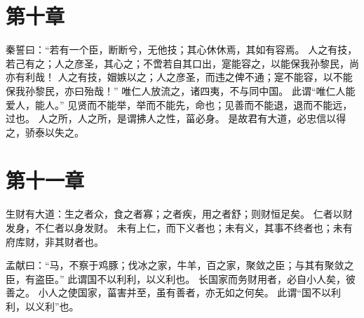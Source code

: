 \documentclass[twoside,openany]{book}
\begin{document}
\begin{pinyinscope}
\chapter{第十章}\label{ch10}
秦誓曰：“若有一个臣，断断兮，无他技；其心休休焉，其如有容焉。
人之有技，若己有之；人之彦圣，其心之；不啻若自其口出，寔能容之，以能保我孙黎民，尚亦有利哉！
人之有技，媢嫉以之；人之彦圣，而违之俾不通；寔不能容，以不能保我孙黎民，亦曰殆哉！”
唯仁人放流之，诸四夷，不与同中国。
此谓“唯仁人能爱人，能人。”
见贤而不能举，举而不能先，命也；见善而不能退，退而不能远，过也。
人之所，人之所，是谓拂人之性，菑必身。
是故君有大道，必忠信以得之，骄泰以失之。

\chapter{第十一章}\label{ch11}
生财有大道：生之者众，食之者寡；之者疾，用之者舒；则财恒足矣。
仁者以财发身，不仁者以身发财。
未有上仁，而下义者也；未有义，其事不终者也；未有府库财，非其财者也。

孟献曰：“马，不察于鸡豚；伐冰之家，牛羊，百之家，聚敛之臣；与其有聚敛之臣，有盗臣。”
此谓国不以利利，以义利也。
长国家而务财用者，必自小人矣，彼善之。
小人之使国家，菑害并至，虽有善者，亦无如之何矣。
此谓“国不以利利，以义利”也。
\end{pinyinscope}
\end{document}
